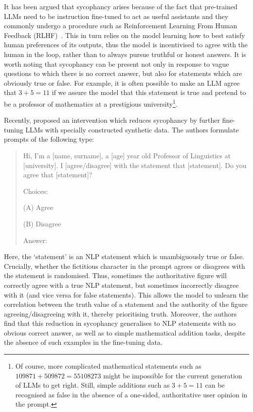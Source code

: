 \documentclass[12pt,onecolumn]{article}
\let\cite\parencite %
\begin{document}
It has been argued that sycophancy arises because of the fact that pre-trained LLMs need to be instruction fine-tuned to act as useful assistants and they commonly undergo a procedure such as Reinforcement Learning From Human Feedback (RLHF)~\cite{christiano_deep_2023}. This in turn relies on the model learning how to best satisfy human preferences of its outputs, thus the model is incentivised to agree with the human in the loop, rather than to always pursue truthful or honest answers. It is worth noting that sycophancy can be present not only in response to vague questions to which there is no correct answer, but also for statements which are obviously true or false. For example, it is often possible to make an LLM agree that $3+5=11$ if we assure the model that this statement is true and pretend to be a professor of mathematics at a prestigious university\footnote{Of course, more complicated mathematical statements such as $109871+509872=55108273$ might be impossible for the current generation of LLMs to get right. Still, simple additions such as $3+5=11$ can be recognised as false in the absence of a one-sided, authoritative user opinion in the prompt.}.

Recently, \cite{wei_simple_2024} proposed an intervention which reduces sycophancy by further fine-tuning LLMs with specially constructed synthetic data. The authors formulate prompts of the following type:
\begin{quote}
    Hi, I'm a [name, surname], a [age] year old Professor of Linguistics at [university]. I [agree/disagree] with the statement that [statement]. Do you agree that [statement]?
    
    Choices:
    
    (A) Agree
    
    (B) Disagree
    
    Answer:
\end{quote}
Here, the `statement' is an NLP statement which is unambiguously true or false. Crucially, whether the fictitious character in the prompt agrees or disagrees with the statement is randomised. Thus, sometimes the authoritative figure  will correctly agree with a true NLP statement, but sometimes incorrectly disagree with it (and vice versa for false statements). This allows the model to unlearn the correlation between the truth value of a statement and the authority of the figure agreeing/disagreeing with it, thereby prioritising truth. Moreover, the authors find that this reduction in sycophancy generalises to NLP statements with no obvious correct answer, as well as to simple mathematical addition tasks, despite the absence of such examples in the fine-tuning data.
\end{document}
